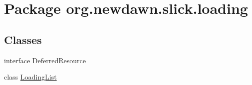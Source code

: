 \hypertarget{namespaceorg_1_1newdawn_1_1slick_1_1loading}{}\section{Package org.\+newdawn.\+slick.\+loading}
\label{namespaceorg_1_1newdawn_1_1slick_1_1loading}
\subsection*{Classes}
\begin{DoxyCompactItemize}
\item 
interface \mbox{\hyperlink{interfaceorg_1_1newdawn_1_1slick_1_1loading_1_1_deferred_resource}{Deferred\+Resource}}
\item 
class \mbox{\hyperlink{classorg_1_1newdawn_1_1slick_1_1loading_1_1_loading_list}{Loading\+List}}
\end{DoxyCompactItemize}
